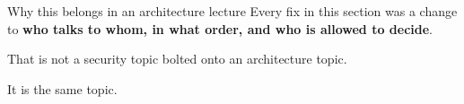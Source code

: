 \begin{frame}{Why this belongs in an architecture lecture}
  \vspace{0.6em}
  \large
  Every fix in this section was a change to \textbf{who talks to whom, in what
  order, and who is allowed to decide}.

  \vspace{1.0em}
  \normalsize
  That is not a security topic bolted onto an architecture topic.

  \vspace{0.5em}
  It is the same topic.

  \vspace{1.0em}
\end{frame}
